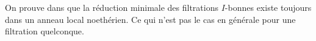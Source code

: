 \begin{maremarque}
	On prouve dans \cite{Di2} que la réduction minimale des filtrations $I$-bonnes existe toujours dans un anneau local noethérien. Ce qui n'est pas le cas en générale pour une filtration quelconque.
\end{maremarque}
%
%
%
%	
%	
%	
%	
%	
%	
%	
%	
%	
